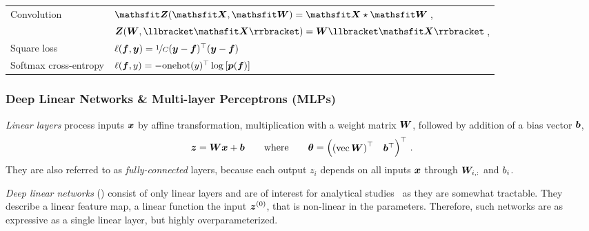 \begin{table}[!t]
\begin{footnotesize}
\begin{tabular}{ll}
      Convolution & $\tZ(\tX, \tW) = \tX \star \tW$\,,
      \\
                         & $\mZ(\mW, \llbracket\tX\rrbracket) = \mW \llbracket \tX \rrbracket$\,,
      \\
      \midrule
      Square loss & $\ell({\bm{f}}, {\bm{y}}) = \nicefrac{1}{C} ({\bm{y}}-{\bm{f}})^\top ({\bm{y}} - {\bm{f}})$ \\
      Softmax cross-entropy & $\ell({\bm{f}}, y) = - \mathrm{onehot}(y)^\top \log\left[{\bm{p}}({\bm{f}})\right]$
      \\
      \bottomrule
    \end{tabular}
  \end{footnotesize}
\end{table}

\subsubsection{Deep Linear Networks \& Multi-layer Perceptrons (MLPs)}

\emph{Linear layers} process inputs ${\bm{x}}$ by affine transformation, \ie multiplication
with a weight matrix ${\bm{W}}$, followed by addition of a bias vector ${\bm{b}}$,
\begin{align}\label{eq:background::LinearLayer}
  {\bm{z}} = {\bm{W}} {\bm{x}} + {\bm{b}}
  \qquad
  \text{where}
  \qquad
  {\bm{\theta}} =
  \begin{pmatrix}
    {(\operatorname{vec}{\bm{W}})}^{\top} & {{\bm{b}}}^{\top}
  \end{pmatrix}^{\top}\,.
\end{align}
They are also referred to as \emph{fully-connected} layers, because each output
$z_i$ depends on all inputs ${\bm{x}}$ through ${\bm{W}}_{i,:}$ and ${b}_i$.

\emph{Deep linear networks} %
%
() consist of
only linear layers and are of interest for analytical
studies~\cite[\eg][]{saxe2014exact,mulayoff2020unique,bernacchia2018exact} as
they are somewhat tractable. They describe a linear feature map, \ie a linear
function \wrt the input ${\bm{z}}^{(0)}$, that is non-linear in the parameters.
Therefore, such networks are as expressive as a single linear layer, but highly
overparameterized.

